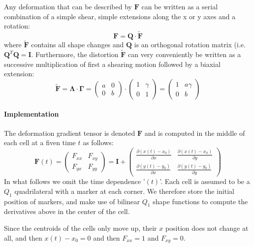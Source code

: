 Any deformation that can be described by ${\bm F}$ 
can be written as a serial combination of a
simple shear, simple extensions along the x or y axes and a rotation:
\[
{\bm F} = {\bm Q} \cdot \tilde{\bm F}
\]
where $\tilde{\bm F}$ contains all shape changes and ${\bm Q}$ 
is an orthogonal rotation matrix (i.e. ${\bm Q}^T{\bm Q}={\bm I}$.
Furthermore, the distortion $\tilde{\bm F}$ can very conveniently be 
written as a successive multiplication of first a
shearing motion followed by a biaxial extension:
\[
\tilde{\bm F} 
= {\bm \Lambda} \cdot {\bm \Gamma }
=
\left(
\begin{array}{cc}
a & 0 \\ 0 & b 
\end{array}
\right)
\cdot
\left(
\begin{array}{cc}
1 & \gamma \\ 0 & 1 
\end{array}
\right)
=
\left(
\begin{array}{cc}
1 & a \gamma \\ 0 & b 
\end{array}
\right)
\]



\paragraph{Implementation}
The deformation gradient tensor is denoted ${\bm F}$ and is computed in the middle of
each cell at a fiven time $t$ as follows:
\[
{\bm F}(t)
=
\left(
\begin{array}{cc}
F_{xx} & F_{xy} \\
F_{yx} & F_{yy} 
\end{array}
\right)
=
{\bm I}+
\left(
\begin{array}{cc}
\frac{\partial (x(t)-x_0)}{\partial x}  & \frac{\partial (x(t)-x_0)}{\partial y}  \\
\frac{\partial (y(t)-y_0)}{\partial x}  & \frac{\partial (y(t)-y_0)}{\partial y}  
\end{array}
\right)
\]
In what follows we omit the time dependence '$(t)$'.
Each cell is assumed to be a $Q_1$ quadrilateral with a marker at each corner. We therefore store the 
initial position of markers, and make use of bilinear $Q_1$ shape functions to compute the derivatives
above in the center of the cell.


Since the centroids of the cells only move up, their $x$ position does not change 
at all, and then $x(t)-x_0=0$ and then $F_{xx}=1$ and $F_{xy}=0$.



